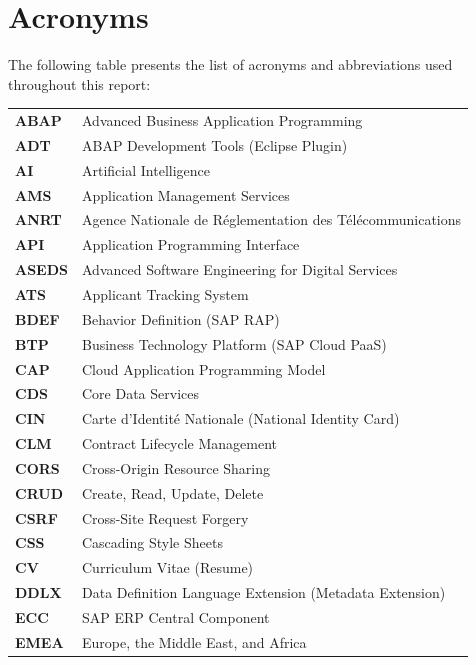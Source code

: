 \chapter{Acronyms}

\noindent
The following table presents the list of acronyms and abbreviations used throughout this report:

\vspace{0.5cm}

\begingroup
\setlength{\LTleft}{\parindent}
\setlength{\LTright}{\fill}
\begin{longtable}{p{2.8cm} p{12cm}}
\textbf{ABAP} & Advanced Business Application Programming \\
\textbf{ADT} & ABAP Development Tools (Eclipse Plugin) \\
\textbf{AI} & Artificial Intelligence \\
\textbf{AMS} & Application Management Services \\
\textbf{ANRT} & Agence Nationale de R\'eglementation des T\'el\'ecommunications \\
\textbf{API} & Application Programming Interface \\
\textbf{ASEDS} & Advanced Software Engineering for Digital Services \\
\textbf{ATS} & Applicant Tracking System \\
\textbf{BDEF} & Behavior Definition (SAP RAP) \\
\textbf{BTP} & Business Technology Platform (SAP Cloud PaaS) \\
\textbf{CAP} & Cloud Application Programming Model \\
\textbf{CDS} & Core Data Services \\
\textbf{CIN} & Carte d'Identit\'e Nationale (National Identity Card) \\
\textbf{CLM} & Contract Lifecycle Management \\
\textbf{CORS} & Cross-Origin Resource Sharing \\
\textbf{CRUD} & Create, Read, Update, Delete \\
\textbf{CSRF} & Cross-Site Request Forgery \\
\textbf{CSS} & Cascading Style Sheets \\
\textbf{CV} & Curriculum Vitae (Resume) \\
\textbf{DDLX} & Data Definition Language Extension (Metadata Extension) \\
\textbf{ECC} & SAP ERP Central Component \\
\textbf{EMEA} & Europe, the Middle East, and Africa \\

\end{longtable}
